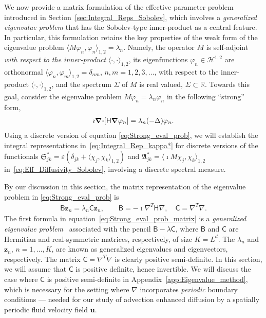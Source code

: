 \documentclass[english,12pt,jmp,graphicx]{revtex4-1}
\newcommand{\vecu}{\boldsymbol{u}}
\newcommand{\vecz}{\boldsymbol{z}}
\newcommand{\secref}[1]{Section~\ref{#1}}
\newcommand{\appref}[1]{Appendix~\ref{#1}}
\newcommand{\bnabla}{\mbox{\boldmath${\nabla}$}}
\newcommand{\bcdot}{\mbox{\boldmath${\cdot}$}}
\newcommand{\Vc}{\mathcal{V}}
\newcommand{\Sg}{\mathfrak{S}}
\newcommand{\Ag}{\mathfrak{A}}
\newcommand{\Hs}{\mathscr{H}}
\newcommand{\Hm}{\mathsf{H}}
\newcommand{\Bm}{\mathsf{B}}
\newcommand{\Cm}{\mathsf{C}}
\begin{document}
We now provide a matrix formulation of the effective parameter problem
introduced in \secref{sec:Integral_Reps_Sobolev}, which involves a
\emph{generalized eigenvalue problem} that has the Sobolev-type
inner-product as a central feature.  In particular, this formulation
retains the key properties of the weak form of the eigenvalue problem 
$\langle M\varphi_n,\varphi_n\rangle_{1,2}=\lambda_n$. Namely, the operator $M$ is self-adjoint
\emph{with respect to the inner-product} $\langle\cdot,\cdot\rangle_{1,2}$, its eigenfunctions $\varphi_n\in\Hs^{1,2}$ are
orthonormal $\langle\varphi_n,\varphi_m\rangle_{1,2}=\delta_{nm}$, $n,m=1,2,3,\ldots$, with respect to the
inner-product $\langle\cdot,\cdot\rangle_{1,2}$, and the spectrum $\Sigma$ of $M$ is real valued,
$\Sigma\subset\mathbb{R}$. Towards this goal, consider the eigenvalue problem
$M\varphi_n=\lambda_n\varphi_n$ in the following ``strong'' form,    
%
\begin{align}\label{eq:Strong_eval_prob}
  \imath\bnabla\bcdot[\Hm\bnabla\varphi_n]=\lambda_n(-\Delta)\varphi_n.
\end{align}
%
Using a discrete version of equation
\eqref{eq:Strong_eval_prob}, we will establish the integral
representations in~\eqref{eq:Integral_Rep_kappa*} for discrete
versions of the functionals
$\Sg^*_{jk}=\varepsilon(\delta_{jk}+\langle\chi_j,\chi_k\rangle_{1,2})$ 
and $\Ag^*_{jk}=\langle\imath M\chi_j,\chi_k\rangle_{1,2}$ 
in~\eqref{eq:Eff_Diffusivity_Sobolev}, involving a discrete spectral
measure.     
 



By our discussion in this section, the matrix  
representation of the eigenvalue problem in
\eqref{eq:Strong_eval_prob} is 
%
\begin{align}\label{eq:Strong_eval_prob_matrix}  
  \Bm\vecz_n=\lambda_n\Cm\vecz_n,
  \qquad
  \Bm=-\imath\nabla^T\Hm\nabla,
  \quad
  \Cm=\nabla^T\nabla.
\end{align}
%
The first formula in equation~\eqref{eq:Strong_eval_prob_matrix} is a
\emph{generalized eigenvalue problem}~\cite{Parlett:1980} associated
with the pencil $\Bm-\lambda\Cm$, where $\Bm$ and $\Cm$ are
Hermitian and real-symmetric matrices, respectively, of size
$K=L^d$. The $\lambda_n$ and $\vecz_n$, $n=1,\ldots,K$, are known as
generalized eigenvalues and eigenvectors, respectively. The matrix
$\Cm=\nabla^T\nabla$ is clearly positive semi-definite. In this
section, we will assume that $\Cm$ is positive definite, hence
invertible. We will discuss the case where  $\Cm$ is positive
semi-definite in \appref{app:Eigenvalue_method}, which is necessary
for the setting where $\nabla$ incorporates \emph{periodic} boundary
conditions --- needed for our study of advection enhanced diffusion by
a spatially periodic fluid velocity field $\vecu$. 
\end{document}
